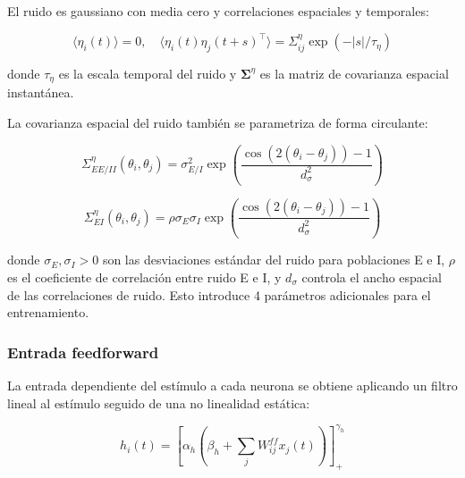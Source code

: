 El ruido es gaussiano con media cero y correlaciones espaciales y temporales:

\begin{equation}
\langle \eta_i(t) \rangle = 0, \quad \langle \eta_i(t) \eta_j(t+s)^\top \rangle = \Sigma_{ij}^\eta \exp(-|s|/\tau_\eta)
\label{eq:noise_correlation}
\end{equation}


donde $\tau_\eta$ es la escala temporal del ruido y $\boldsymbol{\Sigma}^\eta$ es la matriz de covarianza espacial instantánea.

La covarianza espacial del ruido también se parametriza de forma circulante:

\begin{equation}
\Sigma_{EE/II}^\eta(\theta_i, \theta_j) = \sigma_{E/I}^2 \exp\left( \frac{\cos(2(\theta_i - \theta_j)) - 1}{d_\sigma^2} \right)
\label{eq:noise_cov_same}
\end{equation}

\begin{equation}
\Sigma_{EI}^\eta(\theta_i, \theta_j) = \rho \sigma_E \sigma_I \exp\left( \frac{\cos(2(\theta_i - \theta_j)) - 1}{d_\sigma^2} \right)
\label{eq:noise_cov_cross}
\end{equation}

donde $\sigma_E, \sigma_I > 0$ son las desviaciones estándar del ruido para poblaciones E e I, $\rho$ es el coeficiente de correlación entre ruido E e I, y $d_\sigma$ controla el ancho espacial de las correlaciones de ruido. Esto introduce 4 parámetros adicionales para el entrenamiento.

\subsubsection{Entrada feedforward}

La entrada dependiente del estímulo a cada neurona se obtiene aplicando un filtro lineal al estímulo seguido de una no linealidad estática:

\begin{equation}
h_i(t) = \left[ \alpha_h \left( \beta_h + \sum_j W_{ij}^{ff} x_j(t) \right) \right]_+^{\gamma_h}
\label{eq:feedforward_input}
\end{equation}

